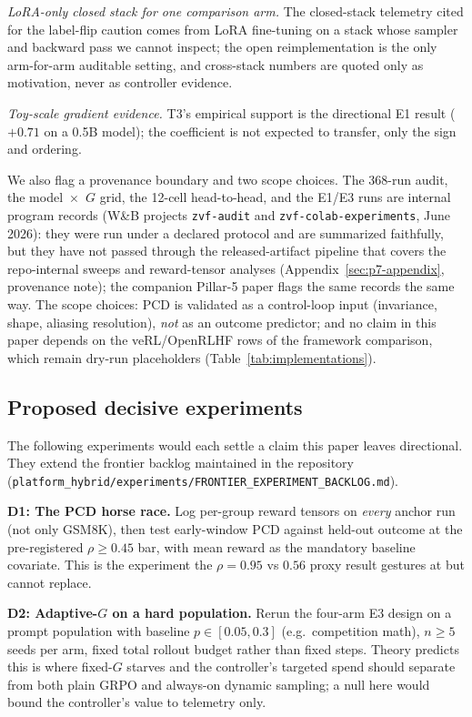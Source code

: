 \documentclass{article}
\providecommand{\tableref}[1]{Table~\ref{#1}}
\begin{document}
\emph{LoRA-only closed stack for one comparison arm.} The closed-stack
telemetry cited for the label-flip caution comes from LoRA
\citep{hu2022lora} fine-tuning on a stack whose sampler and backward pass we
cannot inspect; the open reimplementation is the only arm-for-arm auditable
setting, and cross-stack numbers are quoted only as motivation, never as
controller evidence.

\emph{Toy-scale gradient evidence.} T3's empirical support is the
directional E1 result ($+0.71$ on a 0.5B model); the coefficient is not
expected to transfer, only the sign and ordering.

We also flag a provenance boundary and two scope choices. The 368-run
audit, the model~$\times$~$G$ grid, the 12-cell head-to-head, and the
E1/E3 runs are internal program records (W\&B projects \texttt{zvf-audit}
and \texttt{zvf-colab-experiments}, June 2026): they were run under a
declared protocol and are summarized faithfully, but they have not passed
through the released-artifact pipeline that covers the repo-internal
sweeps and reward-tensor analyses (Appendix~\ref{sec:p7-appendix},
provenance note); the companion Pillar-5 paper flags the same records the
same way. The scope choices: PCD is validated as a control-loop input
(invariance, shape, aliasing resolution), \emph{not} as an outcome
predictor; and no claim in this paper depends on the veRL/OpenRLHF rows of
the framework comparison, which remain dry-run placeholders
(\tableref{tab:implementations}).

\subsection{Proposed decisive experiments}
\label{sec:p7-proposed}
The following experiments would each settle a claim this paper leaves
directional. They extend the frontier backlog maintained in the repository
(\texttt{platform_hybrid/experiments/FRONTIER\_EXPERIMENT\_BACKLOG.md}).

\textbf{D1: The PCD horse race.} Log per-group reward tensors on
\emph{every} anchor run (not only GSM8K), then test early-window PCD
against held-out outcome at the pre-registered $\rho \geq 0.45$ bar, with
mean reward as the mandatory baseline covariate. This is the experiment the
$\rho = 0.95$ vs $0.56$ proxy result gestures at but cannot replace.

\textbf{D2: Adaptive-$G$ on a hard population.} Rerun the four-arm E3
design on a prompt population with baseline $p \in [0.05, 0.3]$ (e.g.\
competition math), $n \geq 5$ seeds per arm, fixed total rollout budget
rather than fixed steps. Theory predicts this is where fixed-$G$ starves
and the controller's targeted spend should separate from both plain GRPO
and always-on dynamic sampling; a null here would bound the controller's
value to telemetry only.
\end{document}
